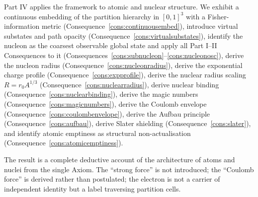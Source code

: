 Part IV applies the framework to atomic and nuclear structure. We exhibit a continuous embedding of the partition hierarchy in $[0,1]^{3}$ with a Fisher-information metric (Consequence~\ref{cons:continuousembed}), introduce virtual substates and path opacity (Consequence~\ref{cons:virtualsubstates}), identify the nucleon as the coarsest observable global state and apply all Part I--II Consequences to it (Consequences~\ref{cons:subnucleon}--\ref{cons:nucleonosc}), derive the nucleon radius (Consequence~\ref{cons:nucleonradius}), derive the exponential charge profile (Consequence~\ref{cons:expprofile}), derive the nuclear radius scaling $R=r_{0}A^{1/3}$ (Consequence~\ref{cons:nuclearradius}), derive nuclear binding (Consequence~\ref{cons:nuclearbinding}), derive the magic numbers (Consequence~\ref{cons:magicnumbers}), derive the Coulomb envelope (Consequence~\ref{cons:coulombenvelope}), derive the Aufbau principle (Consequence~\ref{cons:aufbau}), derive Slater shielding (Consequence~\ref{cons:slater}), and identify atomic emptiness as structural non-actualisation (Consequence~\ref{cons:atomicemptiness}).

The result is a complete deductive account of the architecture of atoms and nuclei from the single Axiom. The ``strong force'' is not introduced; the ``Coulomb force'' is derived rather than postulated; the electron is not a carrier of independent identity but a label traversing partition cells.

